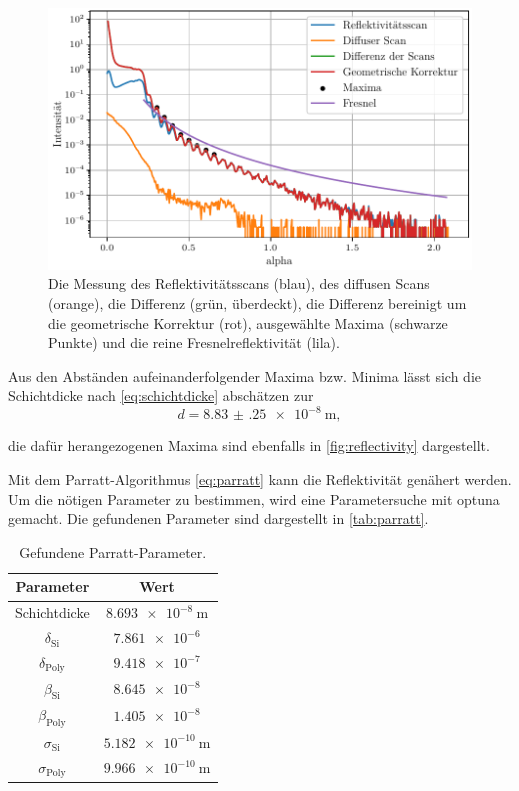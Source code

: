 \begin{figure}[H]
    \centering
    \includegraphics[width=\textwidth]{plots/reflectivity.pdf}
    \caption{Die Messung des Reflektivitätsscans (blau), des diffusen Scans (orange), die Differenz (grün, überdeckt), die Differenz bereinigt um die geometrische Korrektur (rot), ausgewählte Maxima (schwarze Punkte) und die reine Fresnelreflektivität (lila).}
    \label{fig:reflectivity}
\end{figure}

Aus den Abständen aufeinanderfolgender Maxima bzw. Minima lässt sich die Schichtdicke nach \autoref{eq:schichtdicke} abschätzen zur
\begin{equation*}
    d = \qty{8.83(25)e-8}{\meter},
\end{equation*}

die dafür herangezogenen Maxima sind ebenfalls in \autoref{fig:reflectivity} dargestellt.

Mit dem Parratt-Algorithmus \ref{eq:parratt} kann die Reflektivität genähert werden. Um die nötigen Parameter zu bestimmen,
wird eine Parametersuche mit optuna gemacht. Die gefundenen Parameter sind dargestellt in \autoref{tab:parratt}.

\begin{table}[H]
    \centering
    \caption{Gefundene Parratt-Parameter.}
    \label{tab:parratt}
    \begin{tabular}{c c}
        \toprule
        {Parameter} & {Wert} \\
        \midrule
        Schichtdicke & $\qty{8.693e-8}{\meter}$ \\
        $\delta_\text{Si}$ & $\num{7.861e-6}$ \\
        $\delta_\text{Poly}$ & $\num{9.418e-7}$ \\
        $\beta_\text{Si}$    & $\num{8.645e-8}$ \\
        $\beta_\text{Poly}$  & $\num{1.405e-8}$ \\
        $\sigma_\text{Si}$   & $\qty{5.182e-10}{\meter}$ \\
        $\sigma_\text{Poly}$ & $\qty{9.966e-10}{\meter}$ \\
        \bottomrule
    \end{tabular}
\end{table}

